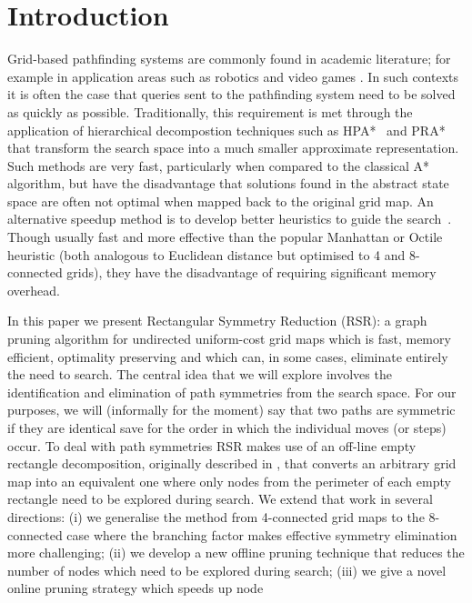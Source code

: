 \section{Introduction}
\label{sec:introduction}

Grid-based pathfinding systems are commonly found in academic literature; for
example in application areas such as robotics \cite{choset05} and video games
\cite{botea04,sturtevant05,bjornsson06}.  In such contexts it is often the case
that queries sent to the pathfinding system need to be solved as quickly as
possible.  Traditionally, this requirement is met through the application of
hierarchical decompostion techniques such as HPA*~\cite{botea04} and PRA*
~\cite{sturtevant05} that transform the search space into a much smaller
approximate representation.  Such methods are very fast, particularly when
compared to the classical A* algorithm, but have the disadvantage that solutions
found in the abstract state space are often not optimal when mapped back to the
original grid map.  An alternative speedup method is to develop better
heuristics to guide the search~\cite{sturtevant09}.  Though usually fast and
more effective than the popular Manhattan or Octile heuristic (both analogous to
Euclidean distance but optimised to 4 and 8-connected grids), they have the
disadvantage of requiring significant memory overhead.
\par
In this paper we present Rectangular Symmetry Reduction (RSR): a graph pruning
algorithm for undirected uniform-cost grid maps which is fast, memory efficient,
optimality preserving and which can, in some cases, eliminate entirely the need
to search.  The central idea that we will explore involves the identification
and elimination of path symmetries from the search space. 
For our purposes, we will (informally for the moment) say that two paths are
symmetric if they are identical save for the order in which the individual moves
(or steps) occur.  To deal with path symmetries RSR makes use of an off-line
empty rectangle decomposition, originally described in \cite{harabor10}, that
converts an arbitrary grid map into an equivalent one where only nodes from the
perimeter of each empty rectangle need to be explored during search.  We extend
that work in several directions: (i) we generalise the method from 4-connected
grid maps to the 8-connected case where the branching factor makes effective
symmetry elimination more challenging; (ii) we develop a new offline pruning
technique that reduces the number of nodes which need to be explored during
search; (iii) we give a novel online pruning strategy which speeds up node

